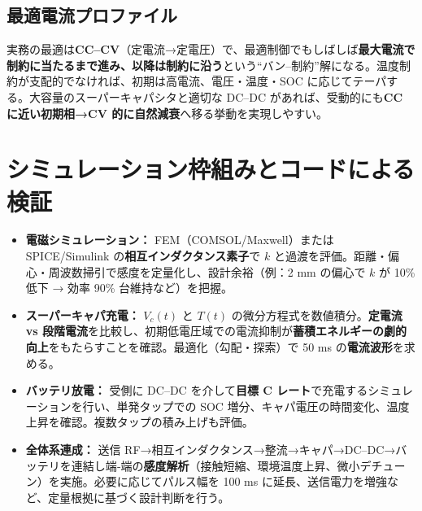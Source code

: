 \documentclass[11pt]{ctexart}
\begin{document}
\subsection{最適電流プロファイル}
実務の最適は\textbf{CC--CV}（定電流→定電圧）で、最適制御でもしばしば\textbf{最大電流で制約に当たるまで進み、以降は制約に沿う}という“バン--制約”解になる。温度制約が支配的でなければ、初期は高電流、電圧・温度・SOC に応じてテーパする。大容量のスーパーキャパシタと適切な DC--DC があれば、受動的にも\textbf{CC に近い初期相→CV 的に自然減衰}へ移る挙動を実現しやすい。

\section{シミュレーション枠組みとコードによる検証}
\begin{itemize}
  \item \textbf{電磁シミュレーション：} FEM（COMSOL/Maxwell）または SPICE/Simulink の\textbf{相互インダクタンス素子}で $k$ と過渡を評価。距離・偏心・周波数掃引で感度を定量化し、設計余裕（例：2 mm の偏心で $k$ が 10\% 低下 → 効率 90\% 台維持など）を把握。
  \item \textbf{スーパーキャパ充電：} $V_c(t)$ と $T(t)$ の微分方程式を数値積分。\textbf{定電流 vs 段階電流}を比較し、初期低電圧域での電流抑制が\textbf{蓄積エネルギーの劇的向上}をもたらすことを確認。最適化（勾配・探索）で 50 ms の\textbf{電流波形}を求める。
  \item \textbf{バッテリ放電：} 受側に DC--DC を介して\textbf{目標 C レート}で充電するシミュレーションを行い、単発タップでの SOC 増分、キャパ電圧の時間変化、温度上昇を確認。複数タップの積み上げも評価。
  \item \textbf{全体系連成：} 送信 RF→相互インダクタンス→整流→キャパ→DC--DC→バッテリを連結し端‐端の\textbf{感度解析}（接触短縮、環境温度上昇、微小デチューン）を実施。必要に応じてパルス幅を 100 ms に延長、送信電力を増強など、定量根拠に基づく設計判断を行う。
\end{itemize}
\end{document}
